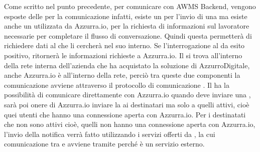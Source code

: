 \begin{trivlist}
	Come scritto nel punto precedente, per comunicare con AWMS Backend, vengono esposte delle  per la comunicazione infatti, esiste un  per l'invio di una  ma esiste anche un  utilizzata da Azzurra.io, per la richiesta di informazioni sul lavoratore necessarie per completare il flusso di conversazione. Quindi questa  permetterà di richiedere dati al  che li cercherà nel suo  interno. Se l'interrogazione al  da esito positivo, ritornerà le informazioni richieste a Azzurra.io. Il  si trova all'interno della rete interna dell'azienda che ha acquistato la soluzione di AzzurroDigitale, anche Azzurra.io è all'interno della rete, perciò tra queste due componenti la comunicazione avviene attraverso il protocollo di comunicazione . Il  ha la possibilità di comunicare direttamente con Azzurra.io quando deve inviare una , sarà poi onere di Azzurra.io inviare la  ai destinatari ma solo a quelli attivi, cioè quei utenti che hanno una connessione aperta con Azzurra.io. Per i destinatati che non sono attivi cioè, quelli non hanno una connessione aperta con Azzurra.io, l'invio della notifica verrà fatto utilizzando i servizi offerti da , la cui comunicazione tra  e  avviene tramite  perché  è un servizio esterno.\\
	

\end{trivlist}
